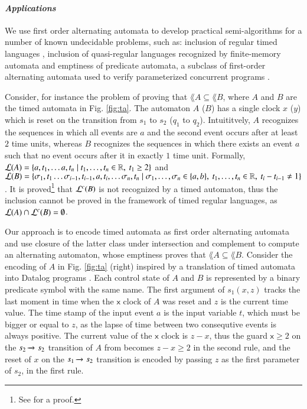 \paragraph{\em Applications}
We use first order alternating automata to develop practical
semi-algorithms for a number of known undecidable problems, such as:
inclusion of regular timed languages \cite{AlurDill94}, inclusion of
quasi-regular languages recognized by finite-memory automata
\cite{KaminskiFrancez94} and emptiness of predicate automata, a
subclass of first-order alternating automata used to verify
parameterized concurrent programs \cite{Farzan15,Farzan16}.

Consider, for instance the problem of proving that $\lang{A} \subseteq
\lang{B}$, where $A$ and $B$ are the timed automata in
Fig. \ref{fig:ta}. The automaton $A$ ($B$) has a single clock $x$
($y$) which is reset on the transition from $s_1$ to $s_2$ ($q_1$ to
$q_2$). Intuititvely, $A$ recognizes the sequences in which all events
are $a$ and the second event occurs after at least $2$ time units,
whereas $B$ recognizes the sequences in which there exists an event
$a$ such that no event occurs after it in exactly $1$ time
unit. Formally, ${\mathcal L}({A}) = \{ a, t_1, \ldots a, t_n \mid t_1,
  \ldots, t_n \in {\bf \mathbb{R}},~ t_1 \geq 2 \}$ and ${\mathcal L}({B}) = \{ \sigma_1,
  t_1 \ldots \sigma_{i-1}, t_{i-1}, a, t_i, \ldots \sigma_n, t_n \mid
  \sigma_1, \ldots, \sigma_n \in \{ a,b \},~ t_1, \ldots, t_n \in
  {\bf \mathbb{R}},~ t_i-t_{i-1} \neq 1 \}$. It is proved\footnote{See
  \cite[Theorem 1]{AlurMadhusudan04} for a proof.} that ${\mathcal L}^c({B})$ is
not recognized by a timed automaton, thus the inclusion cannot be
proved in the framework of timed regular languages, as ${\mathcal L}({A}) \cap
{\mathcal L}^c({B}) = \emptyset$.

Our approach is to encode timed automata as first order alternating
automata and use closure of the latter class under intersection and
complement to compute an alternating automaton, whose emptiness proves
that $\lang{A} \subseteq \lang{B}$. Consider the encoding of $A$ in
Fig. \ref{fig:ta} (right) inspired by a translation of timed automata
into Datalog programs \cite{Fribourg98}.  Each control state of $A$
and $B$ is represented by a binary predicate symbol with the same
name. The first argument of $s_1(x,z)$ tracks the last moment in time
when the $\mathsf{x}$ clock of $A$ was reset and $z$ is the current
time value. The time stamp of the input event $a$ is the input
variable $t$, which must be bigger or equal to $z$, as the lapse of
time between two consequtive events is always positive. The current
value of the $\mathsf{x}$ clock is $z-x$, thus the guard $\mathsf{x}
\geq 2$ on the $s_2 \xrightarrow{{\scriptscriptstyle }}_{{\scriptstyle }} s_2$ transition of $A$ from becomes
$z-x \geq 2$ in the second rule, and the reset of $x$ on the $s_1
\xrightarrow{{\scriptscriptstyle }}_{{\scriptstyle }} s_2$ transition is encoded by passing $z$ as the first
parameter of $s_2$, in the first rule.

